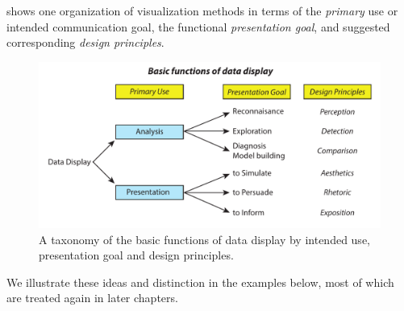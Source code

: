 \documentclass[10pt,krantz2]{krantz}\usepackage[]{graphicx}\usepackage[]{color}
\begin{document}
shows one organization of visualization methods in terms
of the \emph{primary} use or intended communication goal,
the functional \emph{presentation goal}, and suggested corresponding
\emph{design principles}.
\begin{figure}[htbp]
  \centering
  \includegraphics[width=\textwidth]{ch01/fig/datadisp}
  \caption[Basic functions of data display]{A taxonomy of the basic functions of data display by intended use, presentation goal and design principles.}\label{fig:datadisp}
\end{figure}

We illustrate these ideas and distinction in the examples below, most of which
are treated again in later chapters.
\end{document}
